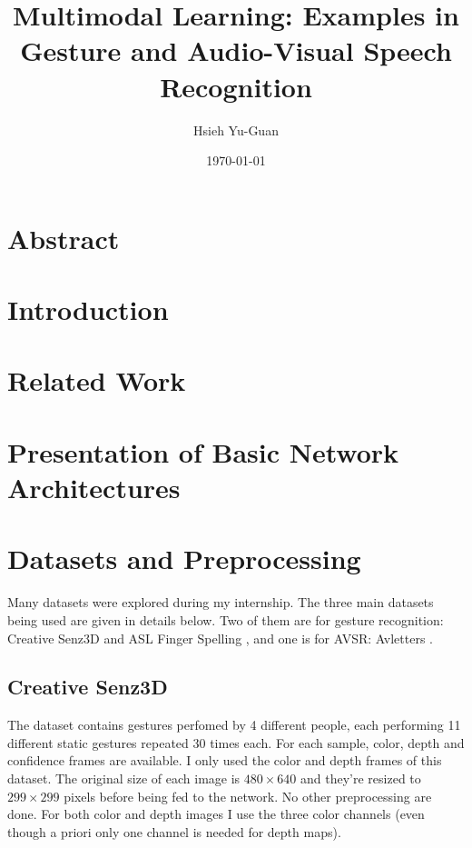 

\title{Multimodal Learning: Examples in Gesture and Audio-Visual
Speech Recognition\vspace{-0.5em}}
\author{Hsieh Yu-Guan}
\date{\today}
\maketitle

\section*{Abstract}

\section{Introduction}

\section{Related Work}

\section{Presentation of Basic Network Architectures}

\section{Datasets and Preprocessing}

Many datasets were explored during my internship. The three main datasets
being used are given in details  below. Two of them are for gesture
recognition:
Creative Senz3D \cite{A. Memo 2015, A. Memo 2017} and ASL Finger Spelling
\cite{N. Pugeault 2011}, and one is for AVSR: Avletters
\cite{I. Matthews 2002}.

\subsection{Creative Senz3D}

The dataset contains gestures perfomed by 4 different people, each
performing 11 different static gestures repeated 30 times each.
For each sample, color, depth and confidence frames are available.
I only used the color and depth frames of this dataset. The original
size of each image is $480 \times 640$ and they're resized to
$299 \times 299$ pixels before being fed to the network. No other
preprocessing are done. For both color and depth images I use the three
color channels (even though a priori only one channel is needed for
depth maps).

